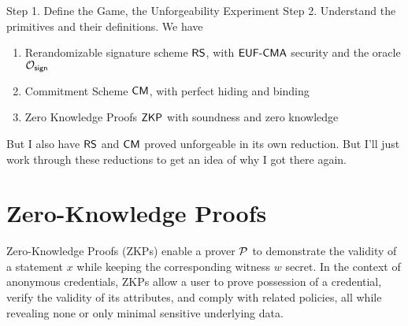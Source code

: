 Step 1. Define the Game, the Unforgeability Experiment
Step 2. Understand the primitives and their definitions. 
We have
\begin{enumerate}
    \item Rerandomizable signature scheme $\mathsf{RS}$, with $\mathsf{EUF\text{-}CMA}$ security and the oracle $\mathcal{O}_{\mathsf{sign}}$ 
    \item Commitment Scheme $\mathsf{CM}$, with perfect hiding and binding 
    \item Zero Knowledge Proofs $\mathsf{ZKP}$ with soundness and zero knowledge
\end{enumerate}
But I also have $\mathsf{RS}$ and $\mathsf{CM}$ proved unforgeable in its own reduction. But I'll just work through these reductions to get an idea of why I got there again.






















































% 
% 










% 
% 
% 
\newpage
\section{Zero-Knowledge Proofs}

Zero-Knowledge Proofs (ZKPs) enable a prover $\mathcal{P}$ to demonstrate the validity of a statement $x$ while keeping the corresponding witness $w$ secret. In the context of anonymous credentials, ZKPs allow a user to prove possession of a credential, verify the validity of its attributes, and comply with related policies, all while revealing none or only minimal sensitive underlying data.

